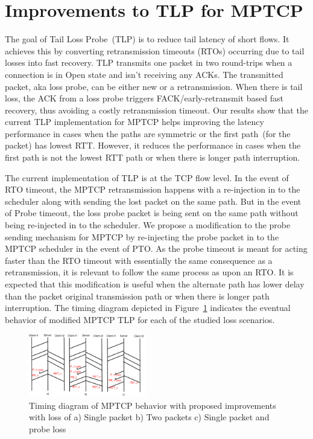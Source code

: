 \documentclass[10pt,conference]{IEEEtran}
\begin{document}
\section{Improvements to TLP for MPTCP}\label{impr}
The goal of Tail Loss Probe~(TLP) is to reduce tail latency of short flows. It achieves this by converting retransmission timeouts (RTOs) occurring due to tail losses into fast recovery. TLP transmits one packet in two round-trips when a connection is in Open state and isn't receiving any ACKs. The transmitted packet, aka loss probe, can be either new or a retransmission. When there is tail loss, the ACK from a loss probe triggers FACK/early-retransmit based fast recovery, thus avoiding a costly retransmission timeout. Our results show that the current TLP implementation for MPTCP helps improving the latency performance in cases when the paths are symmetric or the first path~(for the packet) has lowest RTT. However, it reduces the performance in cases when the first path is not the lowest RTT path or when there is longer path interruption.

The current implementation of TLP is at the TCP flow level. In the event of RTO timeout, the MPTCP retransmission happens with a re-injection in to the scheduler along with sending the lost packet on the same path. But in the event of Probe timeout, the loss probe packet is being sent on the same path without being re-injected in to the scheduler. We propose a modification to the probe sending mechanism for MPTCP by re-injecting the probe packet in to the MPTCP scheduler in the event of PTO. As the probe timeout is meant for acting faster than the RTO timeout with essentially the same consequence as a retransmission, it is relevant to follow the same process as upon an RTO. It is expected that this modification is useful when the alternate path has lower delay than the packet original transmission path or when there is longer path interruption. The timing diagram depicted in Figure~\ref{timingNew} indicates the eventual behavior of modified MPTCP TLP for each of the studied loss scenarios.

\begin{figure}[!ht]
\begin{center}
\includegraphics[angle=0, width=0.46\textwidth]{images/timingER3NewTLP1.pdf}
\end{center}
\caption{Timing diagram of MPTCP behavior with proposed improvements with loss of a) Single packet b) Two packets c) Single packet and probe loss}\label{timingNew}
\end{figure}
\end{document}
